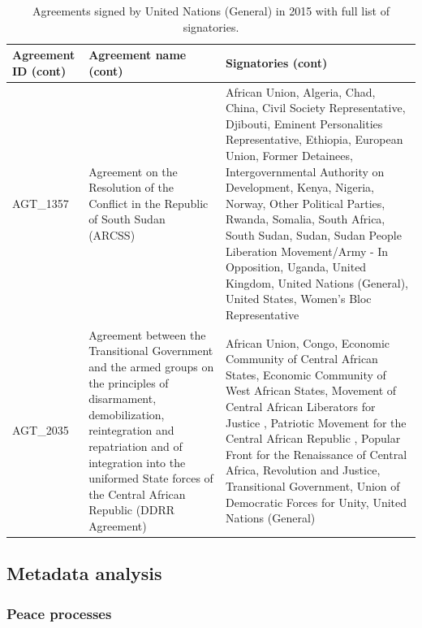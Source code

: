 \documentclass{article}
\begin{document}
\begin{table}[H]
\begin{center}
\small
\begin{tabularx}{\textwidth}{|l|X|X|}
    \hline
    \textbf{Agreement ID (cont)}  & \textbf{Agreement name (cont)}  & \textbf{Signatories (cont)}  \\
    \hline
AGT\_1357 & Agreement on the Resolution of the Conflict in the Republic of South Sudan (ARCSS) & African Union, Algeria, Chad, China, Civil Society Representative, Djibouti, Eminent Personalities Representative, Ethiopia, European Union, Former Detainees, Intergovernmental Authority on Development, Kenya, Nigeria, Norway, Other Political Parties, Rwanda, Somalia, South Africa, South Sudan, Sudan, Sudan People Liberation Movement/Army - In Opposition, Uganda, United Kingdom, United Nations (General), United States, Women's Bloc Representative \\
\hline
AGT\_2035 & Agreement between the Transitional Government and the armed groups on the principles of disarmament, demobilization, reintegration and repatriation and of integration into the uniformed State forces of the Central African Republic (DDRR Agreement) & African Union, Congo, Economic Community of Central African States, Economic Community of West African States, Movement of Central African Liberators for Justice , Patriotic Movement for the Central African Republic , Popular Front for the Renaissance of Central Africa, Revolution and Justice, Transitional Government, Union of Democratic Forces for Unity, United Nations (General) \\
\hline
\end{tabularx}
\end{center}
\normalsize
\caption{Agreements signed by United Nations (General) in 2015 with full list of signatories.}
\end{table}

\subsection{Metadata analysis}

\subsubsection{Peace processes}
\end{document}
